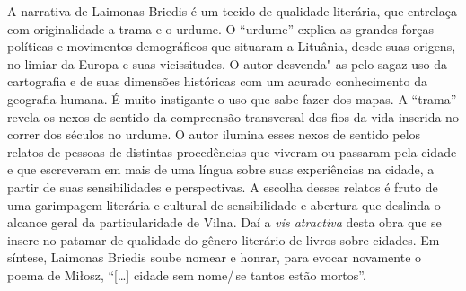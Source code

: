 \begin{multicols}{2}
A narrativa de Laimonas Briedis é um tecido de qualidade literária, que
entrelaça com originalidade a trama e o urdume. O ``urdume'' explica as
grandes forças políticas e movimentos demográficos que situaram a
Lituânia, desde suas origens, no limiar da Europa e suas vicissitudes. O
autor desvenda"-as pelo sagaz uso da cartografia e de suas dimensões
históricas com um acurado conhecimento da geografia humana. É muito
instigante o uso que sabe fazer dos mapas. A ``trama'' revela os nexos de
sentido da compreensão transversal dos fios da vida inserida no correr
dos séculos no urdume. O autor ilumina esses nexos de sentido pelos
relatos de pessoas de distintas procedências que viveram ou passaram
pela cidade e que escreveram em mais de uma língua sobre suas
experiências na cidade, a partir de suas sensibilidades e perspectivas.
A escolha desses relatos é fruto de uma garimpagem literária e cultural
de sensibilidade e abertura que deslinda o alcance geral da
particularidade de Vilna. Daí a \textit{vis atractiva} desta obra que se
insere no patamar de qualidade do gênero literário de livros sobre
cidades. Em síntese, Laimonas Briedis soube nomear e honrar, para evocar
novamente o poema de Miłosz, ``[\ldots{}] cidade sem nome/\,se tantos estão mortos''.

\bigskip
\noindent{}\textcolor{gray}{\footnotesize{}}
\end{multicols}

\pagebreak
\pagestyle{aylloncat}
\begin{multicols}{2}
\end{multicols}
\pagebreak
